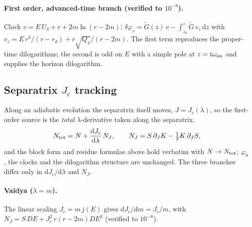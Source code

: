 \documentclass[12pt]{iopart}
\newcommand{\Jc}{J_{c}}
\newcommand{\dd}{\mathrm{d}}
\begin{document}
\paragraph{First order, advanced-time branch (verified to $10^{-8}$).}
Clock $v=E\,U_3+r+2m\ln(r-2m)$;
$\delta\varphi_v=\tilde G(z)\,v-\int_{z_0}^z\tilde G\,v_z\,\dd z$ with
$v_z=E\,r^3/(r-r_d)+r\sqrt{Q_4}/(r-2m)$. The first term reproduces the proper-time
dilogarithms; the second is odd on $E$ with a simple pole at $z=i\omega_{\rm im}$ and
supplies the horizon dilogarithm.

\subsection{Separatrix $\Jc$ tracking}
\label{app:tracking}
Along an adiabatic evolution the separatrix itself moves, $J=\Jc(\lambda)$, so the
first-order source is the \emph{total} $\lambda$-derivative taken along the
separatrix,
\begin{equation}
N_{\rm tot}=N+\frac{\dd\Jc}{\dd\lambda}\,N_J,\qquad
N_J=S\,\partial_JK-\tfrac12K\,\partial_JS,
\label{eq:Ntot-track}
\end{equation}
and the block form and residue formulae above hold verbatim with $N\to N_{\rm tot}$;
$\varphi_0$, the clocks and the dilogarithm structure are unchanged. The three branches
differ only in $\dd\Jc/\dd\lambda$ and $N_J$.

\paragraph{Vaidya ($\lambda=m$).}
The linear scaling $\Jc=m\,j(E)$ gives $\dd\Jc/\dd m=\Jc/m$, with
$N_J=S\,DE+\Jc^2\,r(r-2m)DE^3$ (verified to $10^{-8}$).
\end{document}
